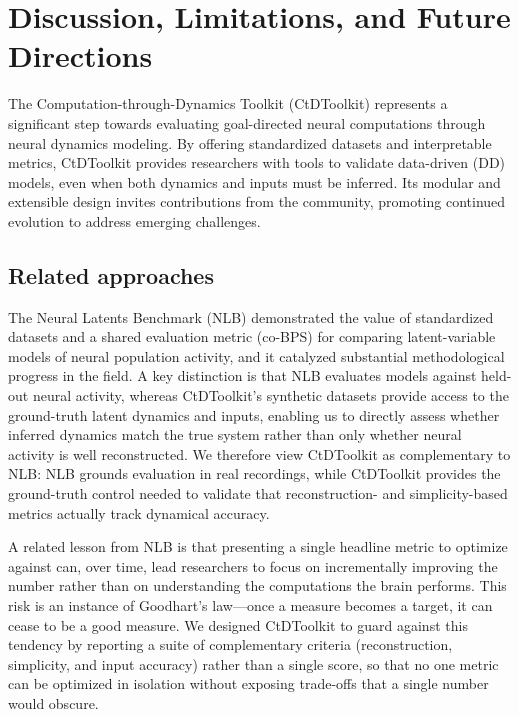 \documentclass{article}
\begin{document}
\vspace{-0.4cm}
\section{Discussion, Limitations, and Future Directions}\label{sec:discussion}
\vspace{-0.3cm}

The Computation-through-Dynamics Toolkit (CtDToolkit) represents a significant step towards evaluating goal-directed neural computations through neural dynamics modeling. By offering standardized datasets and interpretable metrics, CtDToolkit provides researchers with tools to validate data-driven (DD) models, even when both dynamics and inputs must be inferred. Its modular and extensible design invites contributions from the community, promoting continued evolution to address emerging challenges.

\subsection{Related approaches}
\vspace{-0.2cm}

The Neural Latents Benchmark (NLB) \cite{pei_neural_2022} demonstrated the value of standardized datasets and a shared evaluation metric (co-BPS) for comparing latent-variable models of neural population activity, and it catalyzed substantial methodological progress in the field. A key distinction is that NLB evaluates models against held-out neural activity, whereas CtDToolkit's synthetic datasets provide access to the ground-truth latent dynamics and inputs, enabling us to directly assess whether inferred dynamics match the true system rather than only whether neural activity is well reconstructed. We therefore view CtDToolkit as complementary to NLB: NLB grounds evaluation in real recordings, while CtDToolkit provides the ground-truth control needed to validate that reconstruction- and simplicity-based metrics actually track dynamical accuracy.

A related lesson from NLB is that presenting a single headline metric to optimize against can, over time, lead researchers to focus on incrementally improving the number rather than on understanding the computations the brain performs. This risk is an instance of Goodhart's law---once a measure becomes a target, it can cease to be a good measure. We designed CtDToolkit to guard against this tendency by reporting a suite of complementary criteria (reconstruction, simplicity, and input accuracy) rather than a single score, so that no one metric can be optimized in isolation without exposing trade-offs that a single number would obscure.
\end{document}
